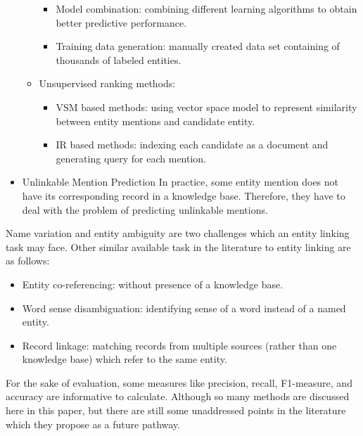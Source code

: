 \documentclass[letterpaper,12pt]{article}
\begin{document}
\begin{itemize}
\begin{itemize}
\begin{itemize}
            \item Model combination: combining different learning algorithms to obtain better predictive performance.
            \item Training data generation: manually created data set containing of thousands of labeled entities.
        \end{itemize}
    \item Unsupervised ranking methods:
        \begin{itemize}
            \item VSM based methods: using vector space model to represent similarity between entity mentions and candidate entity.
            \item IR based methods: indexing each candidate as a document and generating query for each mention.
        \end{itemize}
\end{itemize}

\item Unlinkable Mention Prediction
In practice, some entity mention does not have its corresponding record in a knowledge base. Therefore, they have to deal with the problem of predicting unlinkable mentions.
\end{itemize}

Name variation and entity ambiguity are two challenges which an entity linking task may face. Other similar available task in the literature to entity linking are as follows:
\begin{itemize}
    \item Entity co-referencing: without presence of a knowledge base.
    \item Word sense disambiguation: identifying sense of a word instead of a named entity.
    \item Record linkage: matching records from multiple sources (rather than one knowledge base) which refer to the same entity.
\end{itemize}

For the sake of evaluation, some measures like precision, recall, F1-measure, and accuracy are informative to calculate.
Although so many methods are discussed here in this paper, but there are still some unaddressed points in the literature which they propose as a future pathway.
\end{document}
